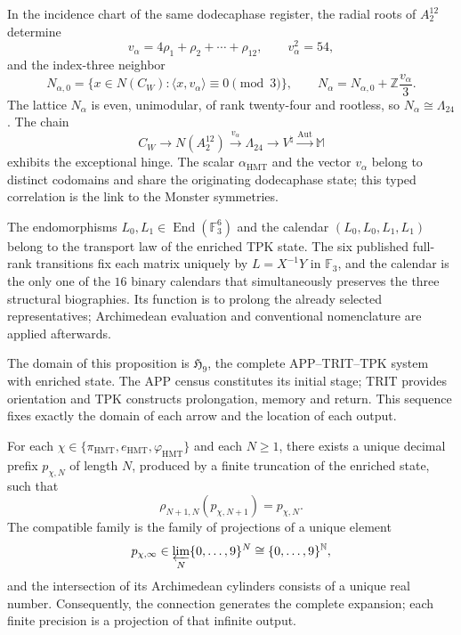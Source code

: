 \begin{theorem}
\label{thm:c27-alpha-rama-excepcional}
In the incidence chart of the same dodecaphase register, the radial roots
of \(A_2^{12}\) determine
\[
v_\alpha=4\rho_1+\rho_2+\cdots+\rho_{12},
\qquad v_\alpha^2=54,
\]
and the index-three neighbor
\[
N_{\alpha,0}
=\{x\in N(C_W):\langle x,v_\alpha\rangle\equiv0\pmod3\},
\qquad
N_\alpha=N_{\alpha,0}+\mathbb Z\frac{v_\alpha}{3}.
\]
The lattice \(N_\alpha\) is even, unimodular, of rank twenty-four and
rootless, so \(N_\alpha\cong\Lambda_{24}\). The chain
\[
C_W\longrightarrow N(A_2^{12})
\xrightarrow{v_\alpha}\Lambda_{24}
\longrightarrow V^\natural
\xrightarrow{\operatorname{Aut}}\mathbb M
\]
exhibits the exceptional hinge. The scalar \(\alpha_{\mathrm{HMT}}\) and the
vector \(v_\alpha\) belong to distinct codomains and share the originating
dodecaphase state; this typed correlation is the link to the
Monster symmetries.
\end{theorem}

\begin{proposition}
\label{prop:c27-estatuto-l0-l1}
The endomorphisms \(L_0,L_1\in\operatorname{End}(\mathbb F_3^6)\) and the
calendar \((L_0,L_0,L_1,L_1)\) belong to the transport law of the enriched
TPK state. The six published full-rank transitions fix
each matrix uniquely by \(L=X^{-1}Y\) in \(\mathbb F_3\), and the
calendar is the only one of the \(16\) binary calendars that simultaneously
preserves the three structural biographies. Its function is to prolong
the already selected representatives; Archimedean evaluation and
conventional nomenclature are applied afterwards.
\end{proposition}

The domain of this proposition is \(\mathfrak H_9\), the complete
APP--TRIT--TPK system with enriched state. The APP census constitutes its initial
stage; TRIT provides orientation and TPK constructs prolongation,
memory and return. This sequence fixes exactly the domain of each
arrow and the location of each output.

\begin{theorem}
\label{thm:c27-profundidad-arbitraria}
For each
\(\chi\in\{\pi_{\mathrm{HMT}},e_{\mathrm{HMT}},
\varphi_{\mathrm{HMT}}\}\) and each \(N\ge1\), there exists a unique decimal
prefix \(p_{\chi,N}\) of length \(N\), produced by a finite
truncation of the enriched state, such that
\[
 \rho_{N+1,N}(p_{\chi,N+1})=p_{\chi,N}.
\]
The compatible family is the family of projections of a unique element
\[
 p_{\chi,\infty}
 \in\varprojlim_N\{0,\ldots,9\}^{N}
 \cong\{0,\ldots,9\}^{\mathbb N},
\]
and the intersection of its Archimedean cylinders consists of a unique real number.
Consequently, the connection generates the complete expansion; each finite
precision is a projection of that infinite output.
\end{theorem}

